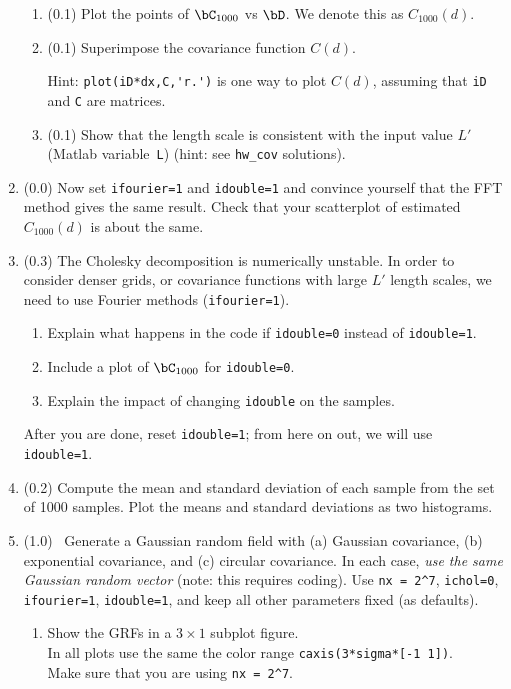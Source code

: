 \documentclass[11pt,titlepage,fleqn]{article}
\begin{document}
\begin{enumerate}
\begin{enumerate}
\item (0.1) Plot the points of $\bC_{1000}$ vs $\bD$. We denote this as $C_{1000}(d)$.


\item (0.1) Superimpose the covariance function $C(d)$.

Hint: \verb+plot(iD*dx,C,'r.')+ is one way to plot $C(d)$, assuming that \verb+iD+ and \verb+C+ are matrices.

\item (0.1) Show that the length scale is consistent with the input value $L'$ (Matlab variable~\verb+L+) (hint: see \verb+hw_cov+ solutions).
\end{enumerate}

\item (0.0) Now set \verb+ifourier=1+ and \verb+idouble=1+ and convince yourself that the FFT method gives the same result. Check that your scatterplot of estimated $C_{1000}(d)$ is about the same.

\item (0.3) The Cholesky decomposition is numerically unstable. In order to consider denser grids, or covariance functions with large $L'$ length scales, we need to use Fourier methods (\verb+ifourier=1+).

\begin{enumerate}
\item Explain what happens in the code if \verb+idouble=0+ instead of \verb+idouble=1+.
\item Include a plot of $\bC_{1000}$ for \verb+idouble=0+.
\item Explain the impact of changing \verb+idouble+ on the samples.
\end{enumerate}
%
After you are done, reset \verb+idouble=1+; from here on out, we will use \verb+idouble=1+.

\item (0.2) Compute the mean and standard deviation of each sample from the set of 1000 samples. Plot the means and standard deviations as two histograms.

\item (1.0) \ptag\ Generate a Gaussian random field with (a) Gaussian covariance, (b) exponential covariance, and (c) circular covariance. In each case, {\em use the same Gaussian random vector} (note: this requires coding). Use \verb+nx = 2^7+, \verb+ichol=0+, \verb+ifourier=1+, \verb+idouble=1+, and keep all other parameters fixed (as defaults).
%
\begin{enumerate}
\item Show the GRFs in a $3 \times 1$ subplot figure. \\
In all plots use the same the color range \verb+caxis(3*sigma*[-1 1])+. \\
Make sure that you are using \verb+nx = 2^7+.


\end{enumerate}
\end{enumerate}
\end{document}
